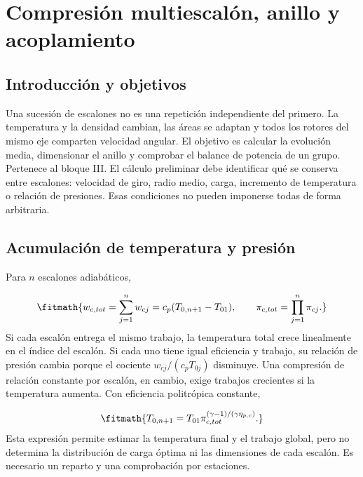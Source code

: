 \documentclass[10pt,openany]{book}
\begin{document}
\studiumchaptercheck

\chapter{Compresión multiescalón, anillo y acoplamiento}
\label{chap:c09}


\section{Introducción y objetivos}

Una sucesión de escalones no es una repetición independiente del primero. La temperatura y la densidad cambian, las áreas se adaptan y todos los rotores del mismo eje comparten velocidad angular. El objetivo es calcular la evolución media, dimensionar el anillo y comprobar el balance de potencia de un grupo. Pertenece al bloque III.
El cálculo preliminar debe identificar qué se conserva entre escalones: velocidad de giro, radio medio, carga, incremento de temperatura o relación de presiones. Esas condiciones no pueden imponerse todas de forma arbitraria.

\section{Acumulación de temperatura y presión}


Para \(n\) escalones adiabáticos,



\[
\fitmath{w_{c,tot}=\sum_{j=1}^n w_{cj}=c_p(T_{0,n+1}-T_{01}),\qquad
\pi_{c,tot}=\prod_{j=1}^n\pi_{cj}.}
\]
Si cada escalón entrega el mismo trabajo, la temperatura total crece linealmente en el índice del escalón. Si cada uno tiene igual eficiencia y trabajo, su relación de presión cambia porque el cociente \(w_{cj}/(c_pT_{0j})\) disminuye. Una compresión de relación constante por escalón, en cambio, exige trabajos crecientes si la temperatura aumenta.
Con eficiencia politrópica constante,

\[
\fitmath{T_{0,n+1}=T_{01}\pi_{c,tot}^{(\gamma-1)/(\gamma\eta_{p,c})}.}
\]
Esta expresión permite estimar la temperatura final y el trabajo global, pero no determina la distribución de carga óptima ni las dimensiones de cada escalón. Es necesario un reparto y una comprobación por estaciones.
\end{document}
